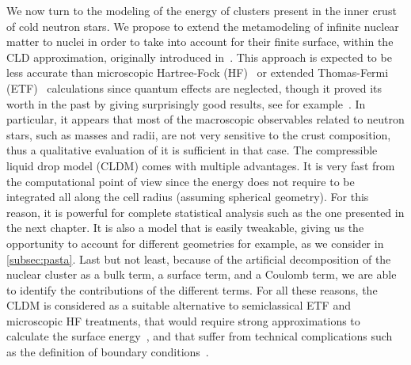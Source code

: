 We now turn to the modeling of the energy of clusters present in the inner crust
of cold neutron stars. We propose to extend the metamodeling of infinite nuclear 
matter to nuclei in order to take into account for their finite surface, within 
the CLD approximation, originally
introduced in~\cite{BBP}. This approach is 
expected to be less accurate than microscopic Hartree-Fock
(HF)~\cite{Negele1973} or extended Thomas-Fermi (ETF)~\cite{Onsi2008} 
calculations since quantum effects are neglected, 
though it proved its worth in the past by giving surprisingly good
results, see for example~\cite{BBP,Lattimer1991,Douchin2000a,Douchin2001}. 
In particular, it
appears that most of the macroscopic observables related to neutron stars, such 
as masses and radii, are not very sensitive to the crust composition, thus a 
qualitative evaluation of it is sufficient in that case.
The compressible liquid drop model (CLDM) comes with multiple advantages. It is
very fast from the computational point of view since the energy does not require
to be integrated all along the cell radius (assuming spherical geometry).
For this reason, it is powerful for complete statistical analysis such as the one 
presented in the next chapter. It is also a model that is easily tweakable, giving 
us the opportunity to account for different geometries for example, as we 
consider in \ref{subsec:pasta}. Last but not 
least, because of the artificial decomposition of the nuclear cluster as a 
bulk term, a surface term, and a Coulomb term, we are able to identify the
contributions of the different terms. For all these reasons, the CLDM is
considered as a suitable alternative to semiclassical ETF and microscopic 
HF treatments, that would require strong approximations to calculate the
surface energy~\cite{BBP,Ravenhall1972}, and that suffer from technical
complications such as the definition of boundary conditions~\cite{Newton2009}.

